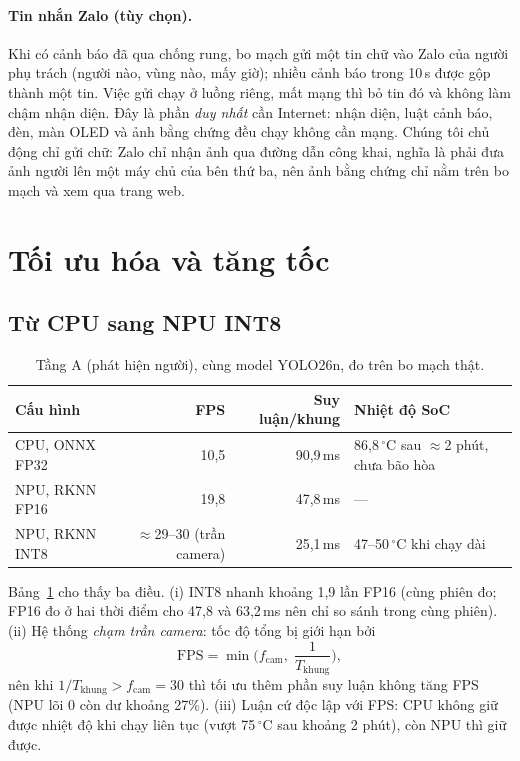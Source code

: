 \documentclass[12pt,a4paper]{article}
\begin{document}
\paragraph{Tin nhắn Zalo (tùy chọn).} Khi có cảnh báo đã qua chống rung, bo mạch gửi một tin chữ vào Zalo của người phụ trách (người nào, vùng nào, mấy giờ);
nhiều cảnh báo trong 10\,s được gộp thành một tin. Việc gửi chạy ở luồng riêng, mất mạng thì bỏ tin đó và không làm chậm nhận diện. Đây là
phần \emph{duy nhất} cần Internet: nhận diện, luật cảnh báo, đèn, màn OLED và ảnh bằng chứng đều chạy không cần mạng. Chúng tôi chủ động chỉ gửi chữ: Zalo
chỉ nhận ảnh qua đường dẫn công khai, nghĩa là phải đưa ảnh người lên một máy chủ của bên thứ ba, nên ảnh bằng chứng chỉ nằm trên bo mạch và xem qua trang web.

\section{Tối ưu hóa và tăng tốc}

\subsection{Từ CPU sang NPU INT8}

\begin{table}[ht]
\centering
\caption{Tầng A (phát hiện người), cùng model YOLO26n, đo trên bo mạch thật.}
\label{tab:npu}
\begin{tabular}{lrrp{4.6cm}}
\toprule
Cấu hình & FPS & Suy luận/khung & Nhiệt độ SoC \\
\midrule
CPU, ONNX FP32 & 10,5 & 90,9\,ms & 86,8\,$^\circ$C sau $\approx$2 phút, chưa bão hòa \\
NPU, RKNN FP16 & 19,8 & 47,8\,ms & --- \\
NPU, RKNN INT8 & $\approx$29--30 (trần camera) & 25,1\,ms & 47--50\,$^\circ$C khi chạy dài \\
\bottomrule
\end{tabular}
\end{table}

Bảng~\ref{tab:npu} cho thấy ba điều. (i) INT8 nhanh khoảng 1,9 lần FP16 (cùng phiên đo; FP16 đo ở hai thời điểm cho
47,8 và 63,2\,ms nên chỉ so sánh trong cùng phiên). (ii) Hệ thống \emph{chạm trần camera}: tốc độ tổng bị giới hạn bởi
\begin{equation}
  \mathrm{FPS}=\min\!\Big(f_{\text{cam}},\;\frac{1}{T_{\text{khung}}}\Big),
\end{equation}
nên khi $1/T_{\text{khung}}>f_{\text{cam}}=30$ thì tối ưu thêm phần suy luận không tăng FPS (NPU lõi 0 còn dư khoảng
27\%). (iii) Luận cứ độc lập với FPS: CPU không giữ được nhiệt độ khi chạy liên tục (vượt 75\,$^\circ$C sau
khoảng 2 phút), còn NPU thì giữ được.
\end{document}
